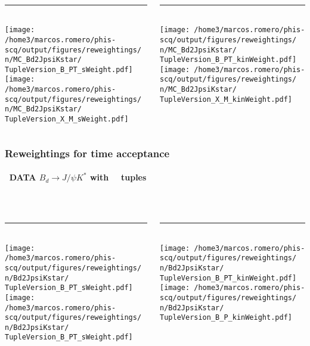 {\begin{frame}
\begin{columns}[T]
\begin{column}{0.48\textwidth}
\\[-4mm]\rule{\columnwidth}{0.1mm}\\[1mm]
  \texttt{[image: /home3/marcos.romero/phis-scq/output/figures/reweightings/\\n/MC\_Bd2JpsiKstar/\\TupleVersion\_B\_PT\_sWeight.pdf]}
  \texttt{[image: /home3/marcos.romero/phis-scq/output/figures/reweightings/\\n/MC\_Bd2JpsiKstar/\\TupleVersion\_X\_M\_sWeight.pdf]}
\end{column}
\begin{column}{0.48\textwidth}
\\[-4mm]\rule{\columnwidth}{0.1mm}\\[1mm]
  \texttt{[image: /home3/marcos.romero/phis-scq/output/figures/reweightings/\\n/MC\_Bd2JpsiKstar/\\TupleVersion\_B\_PT\_kinWeight.pdf]}
  \texttt{[image: /home3/marcos.romero/phis-scq/output/figures/reweightings/\\n/MC\_Bd2JpsiKstar/\\TupleVersion\_X\_M\_kinWeight.pdf]}
\end{column}
\end{columns}
\end{frame} %
%
\begin{frame} %
\frametitle{Reweightings for time acceptance}
\framesubtitle{\n \, DATA $B_d\rightarrow J/\psi K^*$ with \, \TupleVersion\, tuples}
\vspace*{-0.2cm}
\begin{columns}[T]
\begin{column}{0.48\textwidth}
\\[-4mm]\rule{\columnwidth}{0.1mm}\\[1mm]
  \texttt{[image: /home3/marcos.romero/phis-scq/output/figures/reweightings/\\n/Bd2JpsiKstar/\\TupleVersion\_B\_PT\_sWeight.pdf]}
  \texttt{[image: /home3/marcos.romero/phis-scq/output/figures/reweightings/\\n/Bd2JpsiKstar/\\TupleVersion\_B\_PT\_sWeight.pdf]}
\end{column}
\begin{column}{0.48\textwidth}
\\[-4mm]\rule{\columnwidth}{0.1mm}\\[1mm]
  \texttt{[image: /home3/marcos.romero/phis-scq/output/figures/reweightings/\\n/Bd2JpsiKstar/\\TupleVersion\_B\_PT\_kinWeight.pdf]}
  \texttt{[image: /home3/marcos.romero/phis-scq/output/figures/reweightings/\\n/Bd2JpsiKstar/\\TupleVersion\_B\_P\_kinWeight.pdf]}
\end{column}
\end{columns}
\end{frame} %
%
}

